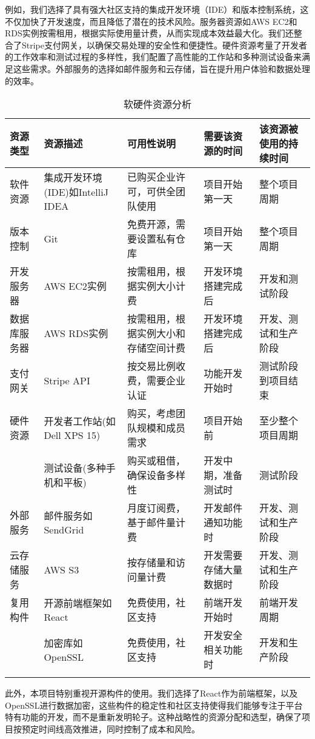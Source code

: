 \documentclass{ctexart}
\begin{document}
例如，我们选择了具有强大社区支持的集成开发环境（IDE）和版本控制系统，这不仅加快了开发速度，而且降低了潜在的技术风险。服务器资源如AWS EC2和RDS实例按需租用，根据实际使用量计费，从而实现成本效益最大化。我们还整合了Stripe支付网关，以确保交易处理的安全性和便捷性。硬件资源考量了开发者的工作效率和测试过程的多样性，我们配置了高性能的工作站和多种测试设备来满足这些需求。外部服务的选择如邮件服务和云存储，旨在提升用户体验和数据处理的效率。

\begin{longtable}[c]{@{}p{2.5cm}p{3.5cm}p{3cm}p{2.5cm}p{2.5cm}@{}}


\toprule
资源类型 & 资源描述 & 可用性说明 & 需要该资源的时间 & 该资源被使用的持续时间 \\* \midrule
\endfirsthead
%
\endhead
%
软件资源 & 集成开发环境(IDE)如IntelliJ IDEA & 已购买企业许可，可供全团队使用 & 项目开始第一天 & 整个项目周期 \\
版本控制 & Git & 免费开源，需要设置私有仓库 & 项目开始第一天 & 整个项目周期 \\
开发服务器 & AWS EC2实例 & 按需租用，根据实例大小计费 & 开发环境搭建完成后 & 开发和测试阶段 \\
数据库服务器 & AWS RDS实例 & 按需租用，根据实例大小和存储空间计费 & 开发环境搭建完成后 & 开发、测试和生产阶段 \\
支付网关 & Stripe API & 按交易比例收费，需要企业认证 & 功能开发开始时 & 测试阶段到项目结束 \\
硬件资源 & 开发者工作站(如Dell XPS 15) & 购买，考虑团队规模和成员需求 & 项目开始前 & 至少整个项目周期 \\
          & 测试设备(多种手机和平板) & 购买或租借，确保设备多样性 & 开发中期，准备测试时 & 测试阶段 \\
外部服务 & 邮件服务如SendGrid & 月度订阅费，基于邮件量计费 & 开发邮件通知功能时 & 开发、测试和生产阶段 \\
云存储服务 & AWS S3 & 按存储量和访问量计费 & 开发需要存储大量数据时 & 开发、测试和生产阶段 \\
复用构件 & 开源前端框架如React & 免费使用，社区支持 & 前端开发开始时 & 前端开发周期 \\
          & 加密库如OpenSSL & 免费使用，社区支持 & 开发安全相关功能时 & 开发和生产阶段 \\
\bottomrule
\caption{软硬件资源分析} \\
\end{longtable}

此外，本项目特别重视开源构件的使用。我们选择了React作为前端框架，以及OpenSSL进行数据加密，这些构件的稳定性和社区支持使得我们能够专注于平台特有功能的开发，而不是重新发明轮子。这种战略性的资源分配和选型，确保了项目按预定时间线高效推进，同时控制了成本和风险。
\end{document}
